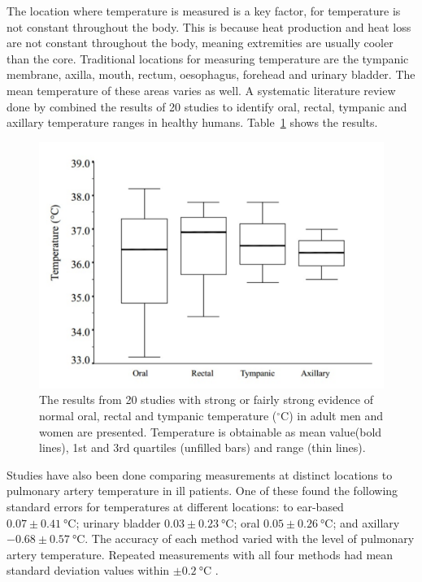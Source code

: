 \medskip
The location where temperature is measured is a key factor, for temperature is not constant throughout the body. This is because heat production and heat loss are not constant throughout the body, meaning extremities are usually cooler than the core. Traditional locations for measuring temperature are the tympanic membrane, axilla, mouth, rectum, oesophagus, forehead and urinary bladder. The mean temperature of these areas varies as well. A systematic literature review done by \cite{sund2002normal} combined the results of 20 studies to identify oral, rectal, tympanic and axillary temperature ranges in healthy humans. Table~\ref{fig:VariationsInTemp} shows the results.

 \begin{figure}[H]
   \centering
   \includegraphics[scale=0.3]{figs/VariationsInTemp}
   \caption{The results from 20 studies with strong or fairly strong evidence of normal oral, rectal and tympanic temperature ($^{\circ}$C) in adult men and women are presented. Temperature is obtainable as mean value(bold lines), 1st and 3rd quartiles (unfilled bars) and range (thin lines).}
   \label{fig:VariationsInTemp}
\end{figure}

Studies have also been done comparing measurements at distinct locations to pulmonary artery temperature in ill patients. One of these found the following standard errors for temperatures at different locations: to ear-based  $0.07\pm \SI{0.41}{\celsius}$; urinary bladder  $0.03\pm \SI{0.23}{\celsius}$; oral  $0.05\pm \SI{0.26}{\celsius}$; and axillary $-0.68\pm \SI{0.57}{\celsius}$. The accuracy of each method varied with the level of pulmonary artery temperature. Repeated measurements with all four methods had mean standard deviation values within $\pm \SI{0.2}{\celsius}$ \citep{erickson1993comparison}.

